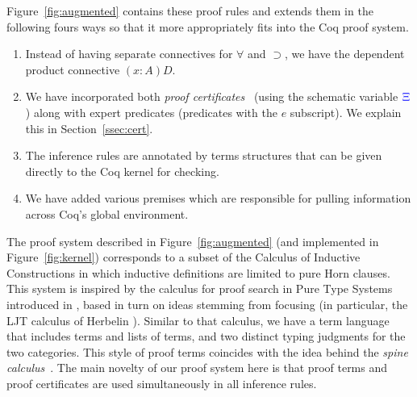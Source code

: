 Figure~\ref{fig:augmented} contains these proof rules and extends them
in the following fours ways so that it more appropriately fits into
the Coq proof system.
\begin{enumerate}
  \item Instead of having separate connectives for $\forall$ and
    $\supset$, we have the dependent product connective $(x:A)D$. 
  \item We have incorporated both \emph{proof certificates}~\cite{chihani17jar} (using the
    schematic variable ${\color{blue}{\Xi}}$) along with expert predicates
    (predicates with the $e$ subscript). We explain this in Section~\ref{ssec:cert}.
  \item The inference rules are  annotated by terms structures that
    can be given directly to the Coq kernel for checking.
  \item We have added various premises which are responsible for
    pulling information across  Coq's global environment.
\end{enumerate}
The proof system described in Figure~\ref{fig:augmented} (and
implemented in Figure~\ref{fig:kernel}) corresponds to a subset of the Calculus
of Inductive Constructions in which inductive definitions are
limited to pure Horn clauses.
%
This  system is inspired by the calculus for proof search in
Pure Type Systems introduced in \cite{LengrandDM06}, based in turn on
ideas stemming from focusing (in particular, the LJT calculus of
Herbelin \cite{Herbelin94}). Similar to that calculus, we have a
term language that includes terms and lists of terms, and two distinct
typing judgments for the two categories.
%
This style of  proof terms coincides with the idea behind the \emph{spine
  calculus}~\cite{Cervesato97tr}.  The main novelty of our proof
system here is that proof terms and proof certificates are used
simultaneously in all inference rules.

